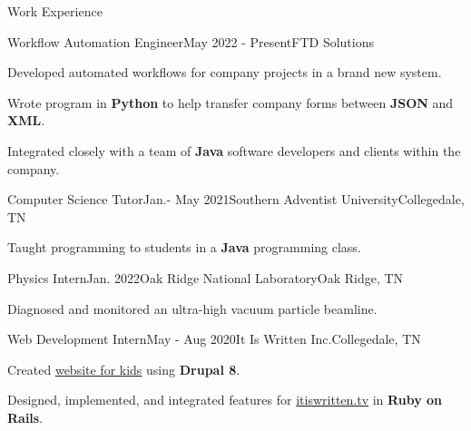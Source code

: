 \begin{rSection}{Work Experience}
	\begin{job}{Workflow Automation Engineer}{May 2022 - Present}{FTD Solutions}{}
		\item Developed automated workflows for company projects in a brand new system.
		\item Wrote program in {\bf Python} to help transfer company forms between {\bf JSON} and {\bf XML}.
		\item Integrated closely with a team of {\bf Java} software developers and clients within the company.
	\end{job}
	
	\begin{job}[]{Computer Science Tutor}{Jan.- May 2021}{Southern Adventist University}{Collegedale, TN}{}
	 \item Taught programming to students in a {\bf Java} programming class.
	\end{job}

	\begin{job}[]{Physics Intern}{Jan. 2022}{Oak Ridge National Laboratory}{Oak Ridge, TN}
	 \item Diagnosed and monitored an ultra-high vacuum particle beamline.
	\end{job}

	\begin{job}{Web Development Intern}{May - Aug 2020}{It Is Written Inc.}{Collegedale, TN}
		\item Created \href{https://buriedtreasure.fun/}{website for kids} using {\bf Drupal 8}.
		\item Designed, implemented, and integrated features for \href{https://itiswritten.tv}{itiswritten.tv} in {\bf Ruby on Rails}.
	\end{job}
\end{rSection}
